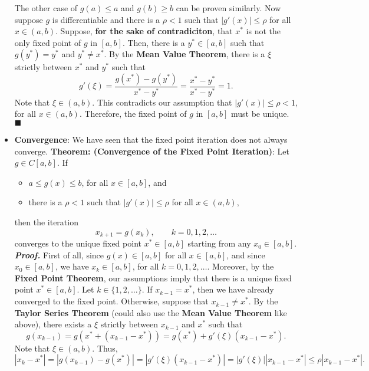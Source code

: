 \documentclass{report}
\begin{document}
\begin{itemize}
    \bigbreak \noindent 
    The other case of $g(a) \leq a$ and $g(b) \geq b$ can be proven similarly.
    \bigbreak \noindent 
    Now suppose $g$ is differentiable and there is a $\rho < 1$ such that $\left|g'(x)\right| \leq \rho$ for all $x \in (a,b)$. Suppose, \textbf{for the sake of contradiciton}, that $x^*$ is not the only fixed point of $g$ in $[a,b]$. Then, there is a $y^* \in [a,b]$ such that $g(y^*) = y^*$ and $y^* \neq x^*$. 
    \bigbreak \noindent 
    By the \textbf{Mean Value Theorem}, there is a $\xi$ strictly between $x^*$ and $y^*$ such that
    $$  g'(\xi) = \frac{g(x^*) - g(y^*)}{x^* - y^*} = \frac{x^* - y^*}{x^* - y^*} = 1.$$
    Note that $\xi \in (a,b)$. This contradicts our assumption that $\left|g'(x)\right| \leq \rho < 1$, for all $x \in (a,b)$. Therefore, the fixed point of $g$ in $[a,b]$ must be unique. $\blacksquare$
\item \textbf{Convergence}: We have seen that the fixed point iteration does not always converge. 
    \bigbreak \noindent 
    \textbf{Theorem: (Convergence of the Fixed Point Iteration)}:
    Let $g \in C[a,b]$. If 
    \begin{itemize}
        \item$a \leq g(x) \leq b$, for all $x \in [a,b]$, and
        \item there is a $\rho < 1$ such that $\left|g'(x)\right| \leq \rho$ for all $x \in (a,b),$
    \end{itemize}
    then the iteration 
    $$x_{k+1} = g(x_{k}), \qquad k = 0, 1, 2, \ldots$$
    converges to the unique fixed point $x^* \in [a,b]$ starting from any $x_0 \in [a,b]$.
    \bigbreak \noindent 
    \textbf{\textit{Proof.}} First of all, since $g(x) \in [a,b]$ for all $x \in [a,b]$, and since $x_0 \in [a,b]$, we have $x_k \in [a,b]$, for all $k = 0, 1, 2, \ldots$. Moreover, by the \textbf{Fixed Point Theorem}, our assumptions imply that there is a unique fixed point $x^* \in [a,b]$. 
    \bigbreak \noindent 
    Let $k \in \{1,2,\ldots\}$. If $x_{k-1} = x^*$, then we have already converged to the fixed point. Otherwise, suppose that $x_{k-1} \neq x^*$. By the \textbf{Taylor Series Theorem} (could also use the \textbf{Mean Value Theorem} like above), there exists a $\xi$ strictly between $x_{k-1}$ and $x^*$ such that 
    $$ g(x_{k-1}) = g(x^* + (x_{k-1} - x^*)) = g(x^*) + g'(\xi) (x_{k-1} - x^*).$$
    Note that $\xi \in (a,b)$. Thus,
    $$ \left|x_k - x^*\right| = \left|g(x_{k-1}) - g(x^*)\right| = \left|g'(\xi)(x_{k-1} - x^*)\right| = \left|g'(\xi)\right|\left|x_{k-1} - x^*\right| \leq \rho \left|x_{k-1} - x^*\right|. $$

\end{itemize}
\end{document}
